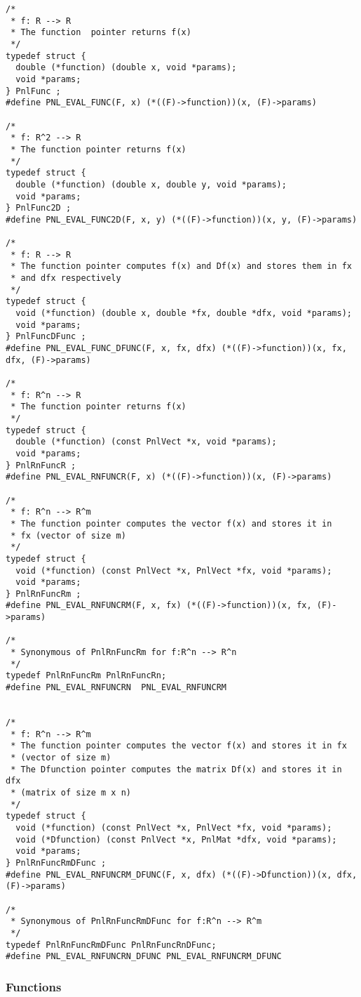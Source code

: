 \begin{verbatim}
/*
 * f: R --> R
 * The function  pointer returns f(x)
 */
typedef struct {
  double (*function) (double x, void *params);
  void *params;
} PnlFunc ;
#define PNL_EVAL_FUNC(F, x) (*((F)->function))(x, (F)->params)

/*
 * f: R^2 --> R
 * The function pointer returns f(x)
 */
typedef struct {
  double (*function) (double x, double y, void *params);
  void *params;
} PnlFunc2D ;
#define PNL_EVAL_FUNC2D(F, x, y) (*((F)->function))(x, y, (F)->params)

/*
 * f: R --> R
 * The function pointer computes f(x) and Df(x) and stores them in fx
 * and dfx respectively
 */
typedef struct {
  void (*function) (double x, double *fx, double *dfx, void *params);
  void *params;
} PnlFuncDFunc ;
#define PNL_EVAL_FUNC_DFUNC(F, x, fx, dfx) (*((F)->function))(x, fx, dfx, (F)->params)

/*
 * f: R^n --> R
 * The function pointer returns f(x)
 */
typedef struct {
  double (*function) (const PnlVect *x, void *params);
  void *params;
} PnlRnFuncR ;
#define PNL_EVAL_RNFUNCR(F, x) (*((F)->function))(x, (F)->params)

/*
 * f: R^n --> R^m
 * The function pointer computes the vector f(x) and stores it in
 * fx (vector of size m)
 */
typedef struct {
  void (*function) (const PnlVect *x, PnlVect *fx, void *params);
  void *params;
} PnlRnFuncRm ;
#define PNL_EVAL_RNFUNCRM(F, x, fx) (*((F)->function))(x, fx, (F)->params)

/*
 * Synonymous of PnlRnFuncRm for f:R^n --> R^n 
 */
typedef PnlRnFuncRm PnlRnFuncRn;
#define PNL_EVAL_RNFUNCRN  PNL_EVAL_RNFUNCRM


/*
 * f: R^n --> R^m
 * The function pointer computes the vector f(x) and stores it in fx
 * (vector of size m) 
 * The Dfunction pointer computes the matrix Df(x) and stores it in dfx
 * (matrix of size m x n) 
 */
typedef struct {
  void (*function) (const PnlVect *x, PnlVect *fx, void *params);
  void (*Dfunction) (const PnlVect *x, PnlMat *dfx, void *params);
  void *params;
} PnlRnFuncRmDFunc ;
#define PNL_EVAL_RNFUNCRM_DFUNC(F, x, dfx) (*((F)->Dfunction))(x, dfx, (F)->params)

/*
 * Synonymous of PnlRnFuncRmDFunc for f:R^n --> R^m
 */
typedef PnlRnFuncRmDFunc PnlRnFuncRnDFunc;
#define PNL_EVAL_RNFUNCRN_DFUNC PNL_EVAL_RNFUNCRM_DFUNC
\end{verbatim}

\subsubsection{Functions}

